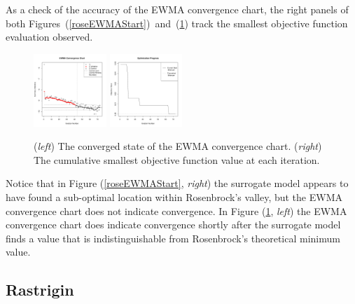 \documentclass[12pt]{article}
\begin{document}
	As a check of the accuracy of the EWMA convergence chart, the right panels of both \mbox{Figures (\ref{roseEWMAStart}) and (\ref{roseEWMAEnd})} track the smallest objective function evaluation observed. 
	\begin{figure}
	\includegraphics[width=0.245\textwidth]{./figures/ewmaConvChartRoseEasyEasyEnd.pdf}
	\includegraphics[width=0.245\textwidth]{./figures/bestZRoseEasyEasyEnd.pdf}
	\caption{({\it left}) The converged state of the EWMA convergence chart. ({\it right}) The cumulative smallest objective function value at each iteration.}
	\label{roseEWMAEnd}
	\end{figure}
	Notice that in Figure (\ref{roseEWMAStart}, {\it right}) the surrogate model appears to have found a sub-optimal location within Rosenbrock's valley, but the EWMA convergence chart does not indicate convergence.
	In Figure (\ref{roseEWMAEnd}, {\it left}) the EWMA convergence chart does indicate convergence shortly after the surrogate model finds a value that is indistinguishable from Rosenbrock's theoretical minimum value.


	\clearpage
	\subsection{Rastrigin}
	
\end{document}
